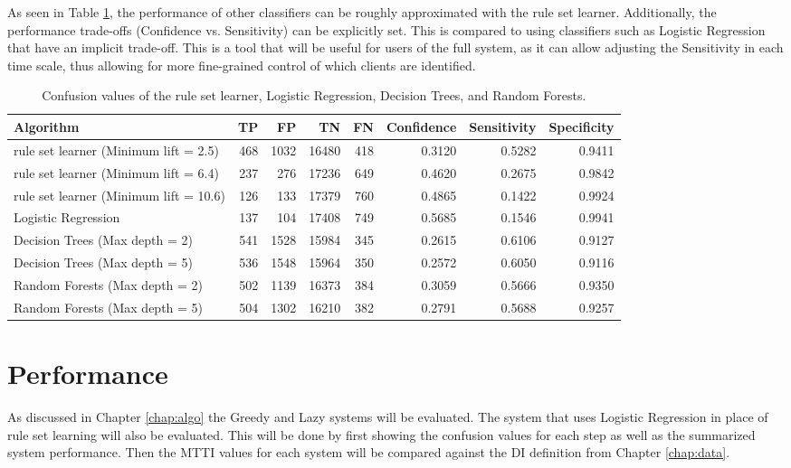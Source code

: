 As seen in Table \ref{tbl:results:30}, the performance of other classifiers can be roughly approximated with the \Abb rule set learner. Additionally, the performance trade-offs (Confidence vs. Sensitivity) can be explicitly set. This is compared to using classifiers such as Logistic Regression that have an implicit trade-off. This is a tool that will be useful for users of the full \Abb system, as it can allow adjusting the Sensitivity in each time scale, thus allowing for more fine-grained control of which clients are identified.

\begin{table}[h]
	\centering

	\begin{tabular}{p{}rrrrrrr}
	\toprule
	{Algorithm} &    TP &     FP &      TN &    FN &  Confidence &  Sensitivity &  Specificity \\
	\midrule
	\Abb rule set learner (Minimum lift = 2.5) & 468 & 1032 & 16480 & 418 & 0.3120 & 0.5282 & 0.9411 \\
	\Abb rule set learner (Minimum lift = 6.4) & 237 & 276 & 17236 & 649 & 0.4620 & 0.2675 & 0.9842 \\
	\Abb rule set learner (Minimum lift = 10.6) & 126 & 133 & 17379 & 760 & 0.4865 & 0.1422 & 0.9924 \\
	Logistic Regression & 137 & 104 & 17408 & 749 & 0.5685 & 0.1546 & 0.9941 \\
	Decision Trees (Max depth = 2) & 541 & 1528 & 15984 & 345 & 0.2615 & 0.6106 & 0.9127 \\
	Decision Trees (Max depth = 5) & 536 & 1548 & 15964 & 350 & 0.2572 & 0.6050 & 0.9116 \\
	Random Forests (Max depth = 2) & 502 & 1139 & 16373 & 384 & 0.3059 & 0.5666 & 0.9350 \\
	Random Forests (Max depth = 5) & 504 & 1302 & 16210 & 382 & 0.2791 & 0.5688 & 0.9257 \\

	\bottomrule
	\end{tabular}

	\caption{Confusion values of the \Abb rule set learner, Logistic Regression, Decision Trees, and Random Forests.}
	\label{tbl:results:30}
\end{table}


\section{\Abb Performance} \label{chap:results:rapid}
As discussed in Chapter \ref{chap:algo} the Greedy and Lazy systems will be evaluated. The system that uses Logistic Regression in place of rule set learning will also be evaluated. This will be done by first showing the confusion values for each step as well as the summarized system performance. Then the MTTI values for each system will be compared against the DI definition from Chapter \ref{chap:data}.


